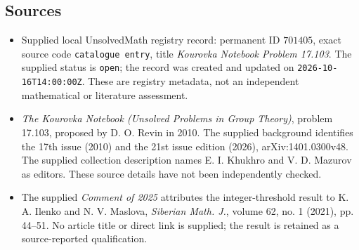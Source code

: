 \documentclass[11pt]{article}
\begin{document}
\subsection{Sources}
\begin{itemize}
\item Supplied local UnsolvedMath registry record: permanent ID \(701405\), exact source code \texttt{catalogue entry}, title \emph{Kourovka Notebook Problem 17.103}. The supplied status is \texttt{open}; the record was created and updated on \texttt{2026-10-16T14:00:00Z}. These are registry metadata, not an independent mathematical or literature assessment.
\item \emph{The Kourovka Notebook (Unsolved Problems in Group Theory)}, problem 17.103, proposed by D. O. Revin in 2010. The supplied background identifies the 17th issue (2010) and the 21st issue edition (2026), arXiv:1401.0300v48. The supplied collection description names E. I. Khukhro and V. D. Mazurov as editors. These source details have not been independently checked.
\item The supplied \emph{Comment of 2025} attributes the integer-threshold result to K. A. Ilenko and N. V. Maslova, \emph{Siberian Math. J.}, volume 62, no. 1 (2021), pp. 44--51. No article title or direct link is supplied; the result is retained as a source-reported qualification.
\end{itemize}
\end{document}
